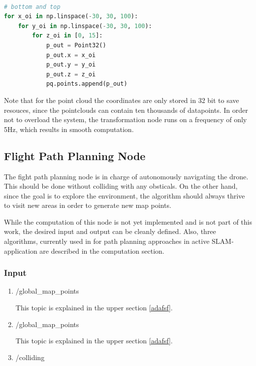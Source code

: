 	\begin{lstlisting}[language=python, caption=Adding upper and lower restrictions to pointcloud. , label=lst:const]
	
# bottom and top 
for x_oi in np.linspace(-30, 30, 100): 
	for y_oi in np.linspace(-30, 30, 100): 
		for z_oi in [0, 15]: 
			p_out = Point32()
			p_out.x = x_oi
			p_out.y = y_oi
			p_out.z = z_oi
			pq.points.append(p_out)

	\end{lstlisting}

	Note that for the point cloud the coordinates are only stored in 32 bit to save resouces, since the pointclouds can contain ten thousands of datapoints. In order not 
	to overload the system, the transformation node runs on a frequency of only 5Hz, which results in smooth computation. 
	
	\subsection{Flight Path Planning Node} \label{path}
	
	The fight path planning node is in charge of autonomously navigating the drone. This should be done without colliding with any obsticals. 
	On the other hand, since the goal is to explore the environment, the algorithm should always thrive to visit new areas in order to generate 
	new map points. 
	
	While the computation of this node is not yet implemented and is not part of this work, the desired input and output can be cleanly defined. 
	Also, three algorithms, currently used in for path planning approaches in active SLAM-application are described in the computation section. 
	
	\subsubsection{Input}
	
	\begin{enumerate}
	\item{/global\_map\_points}
	
	This topic is explained in the upper section \ref{adafsf}. 
	
	\item{/global\_map\_points}
	
	This topic is explained in the upper section \ref{adafsf}.
	
	\item{/colliding}
	
	
	\end{enumerate}
	
